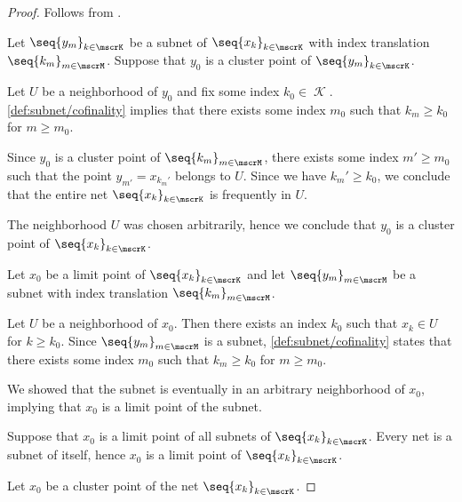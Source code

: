 \begin{proof}
   Follows from .

   Let \( \seq{ y_m }_{k \in \mscrK} \) be a subnet of \( \seq{ x_k }_{k \in \mscrK} \) with index translation \( \seq{ k_m }_{m \in \mscrM} \). Suppose that \( y_0 \) is a cluster point of \( \seq{ y_m }_{k \in \mscrK} \).

  Let \( U \) be a neighborhood of \( y_0 \) and fix some index \( k_0 \in \mscrK \). \ref{def:subnet/cofinality} implies that there exists some index \( m_0 \) such that \( k_m \geq k_0 \) for \( m \geq m_0 \).

  Since \( y_0 \) is a cluster point of \( \seq{ k_m }_{m \in \mscrM} \), there exists some index \( m' \geq m_0 \) such that the point \( y_{m'} = x_{k_m'} \) belongs to \( U \). Since we have \( k_m' \geq k_0 \), we conclude that the entire net \( \seq{ x_k }_{k \in \mscrK} \) is frequently in \( U \).

  The neighborhood \( U \) was chosen arbitrarily, hence we conclude that \( y_0 \) is a cluster point of \( \seq{ x_k }_{k \in \mscrK} \).


  \SufficiencySubProof* Let \( x_0 \) be a limit point of \( \seq{ x_k }_{k \in \mscrK} \) and let \( \seq{ y_m }_{m \in \mscrM} \) be a subnet with index translation \( \seq{ k_m }_{m \in \mscrM} \).

  Let \( U \) be a neighborhood of \( x_0 \). Then there exists an index \( k_0 \) such that \( x_k \in U \) for \( k \geq k_0 \). Since \( \seq{ y_m }_{m \in \mscrM} \) is a subnet, \ref{def:subnet/cofinality} states that there exists some index \( m_0 \) such that \( k_m \geq k_0 \) for \( m \geq m_0 \).

  We showed that the subnet is eventually in an arbitrary neighborhood of \( x_0 \), implying that \( x_0 \) is a limit point of the subnet.

  \NecessitySubProof* Suppose that \( x_0 \) is a limit point of all subnets of \( \seq{ x_k }_{k \in \mscrK} \). Every net is a subnet of itself, hence \( x_0 \) is a limit point of \( \seq{ x_k }_{k \in \mscrK} \).


  \SufficiencySubProof* Let \( x_0 \) be a cluster point of the net \( \seq{ x_k }_{k \in \mscrK} \).


\end{proof}
